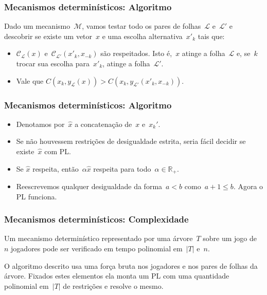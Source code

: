 \documentclass{beamer}
\begin{document}
\begin{frame}
\frametitle{Mecanismos determinísticos: Algoritmo}
Dado um mecanismo~$\mathcal{M}$, vamos testar todo os pares de folhas~$\mathcal{L}$ e~$\mathcal{L}'$ e descobrir se existe um vetor~$x$ e uma escolha alternativa~$x'_k$ tais que:
\begin{itemize}
\item $\mathcal{C}_\mathcal{L}(x)$ e~$\mathcal{C}_{\mathcal{L}'}(x'_k,x_{-k})$ são respeitados. Isto é,~$x$ atinge a folha~$\mathcal{L}$ e, se~$k$ trocar sua escolha para~$x'_k$, atinge a folha~$\mathcal{L}'$.
\item Vale que $C(x_k,y_\mathcal{L}(x)) > C(x_k,y_{\mathcal{L}'}(x'_k,x_{-k}))$.
\end{itemize}
\end{frame}


\begin{frame}
\frametitle{Mecanismos determinísticos: Algoritmo}

\begin{itemize}
\item Denotamos por~$\hat{x}$ a concatenação de~$x$ e~$x_k'$.
\item Se não houvessem restrições de desigualdade estrita, seria fácil decidir se existe~$\hat{x}$ com PL.
\item Se $\hat{x}$ respeita, então~$\alpha \hat{x}$ respeita para todo~$\alpha \in \mathbb{R}_+$.
\item Reescrevemos qualquer desigualdade da forma~$a < b$ como~$a + 1 \leq b$. Agora o PL funciona.
\end{itemize}

\end{frame}

\begin{frame}
\frametitle{Mecanismos determinísticos: Complexidade}

\begin{theorem}
Um mecanismo determinístico representado por uma árvore~$T$ sobre um jogo de~$n$ jogadores pode ser verificado em tempo polinomial em~$|T|$ e~$n$.
\end{theorem}

O algoritmo descrito usa uma força bruta nos jogadores e nos pares de folhas da árvore. Fixados estes elementos ela monta um PL com uma quantidade polinomial em~$|T|$ de restrições e resolve o mesmo.
\end{frame}
\end{document}
